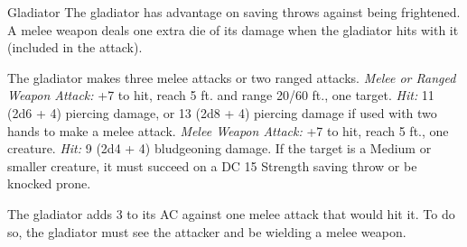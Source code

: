 \documentclass[10pt,a4paper,twoside,twocolumn,openany,bg=print,nodeprecatedcode]{dndbook}
\begin{document}
\begin{DndMonster}[float*=t]{Gladiator}
\DndMonsterBasics[
armor-class = {16 (studded leather armor)},
hit-points = {\DndDice{15d8 + 45}},
speed = {30 ft.}
]
\DndMonsterAbilityScores[
 str = 18,
 dex = 15,
 con = 16,
 int = 10,
 wis = 12,
 cha = 15
]
\DndMonsterDetails[
saving-throws = {Str +7, Dex +5, Con +6},
skills = {Athletics +10, Intimidation +5},
languages = {any one language (usually Common)},
challenge = 5,
]
The gladiator has advantage on saving throws against being frightened.
A melee weapon deals one extra die of its damage when the gladiator hits with it (included in the attack).
\par
{}
The gladiator makes three melee attacks or two ranged attacks.
\textsl{Melee or Ranged Weapon Attack:} +7 to hit, reach 5 ft. and range 20/60 ft., one target. \textsl{Hit:} 11 (2d6 + 4) piercing damage, or 13 (2d8 + 4) piercing damage if used with two hands to make a melee attack.
\textsl{Melee Weapon Attack:} +7 to hit, reach 5 ft., one creature. \textsl{Hit:} 9 (2d4 + 4) bludgeoning damage. If the target is a Medium or smaller creature, it must succeed on a DC 15 Strength saving throw or be knocked prone.
\par
{}
The gladiator adds 3 to its AC against one melee attack that would hit it. To do so, the gladiator must see the attacker and be wielding a melee weapon.
\end{DndMonster}
\end{document}
